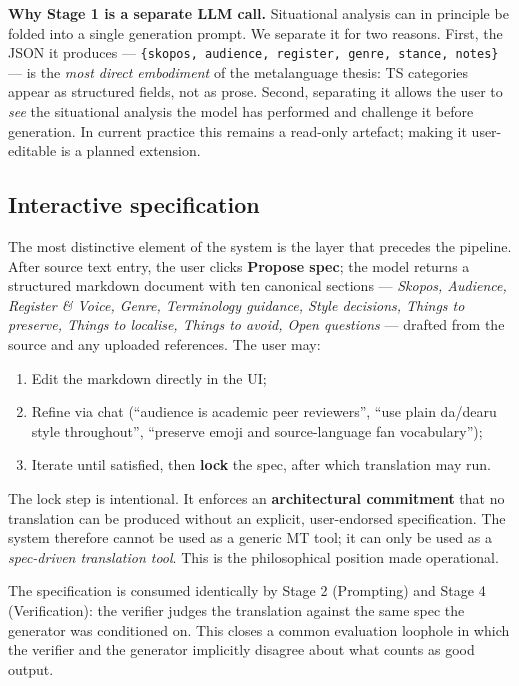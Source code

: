 \documentclass[11pt]{article}
\begin{document}
\textbf{Why Stage 1 is a separate LLM call.} Situational analysis can in principle be folded into a single generation prompt. We separate it for two reasons. First, the JSON it produces --- \texttt{\{skopos, audience, register, genre, stance, notes\}} --- is the \emph{most direct embodiment} of the metalanguage thesis: TS categories appear as structured fields, not as prose. Second, separating it allows the user to \emph{see} the situational analysis the model has performed and challenge it before generation. In current practice this remains a read-only artefact; making it user-editable is a planned extension.

\subsection{Interactive specification}

The most distinctive element of the system is the layer that precedes the pipeline. After source text entry, the user clicks \textbf{Propose spec}; the model returns a structured markdown document with ten canonical sections --- \emph{Skopos, Audience, Register \& Voice, Genre, Terminology guidance, Style decisions, Things to preserve, Things to localise, Things to avoid, Open questions} --- drafted from the source and any uploaded references. The user may:

\begin{enumerate}[leftmargin=*]
\item Edit the markdown directly in the UI;
\item Refine via chat (``audience is academic peer reviewers'', ``use plain da/dearu style throughout'', ``preserve emoji and source-language fan vocabulary'');
\item Iterate until satisfied, then \textbf{lock} the spec, after which translation may run.
\end{enumerate}

The lock step is intentional. It enforces an \textbf{architectural commitment} that no translation can be produced without an explicit, user-endorsed specification. The system therefore cannot be used as a generic MT tool; it can only be used as a \emph{spec-driven translation tool}. This is the philosophical position made operational.

The specification is consumed identically by Stage 2 (Prompting) and Stage 4 (Verification): the verifier judges the translation against the same spec the generator was conditioned on. This closes a common evaluation loophole in which the verifier and the generator implicitly disagree about what counts as good output.
\end{document}
